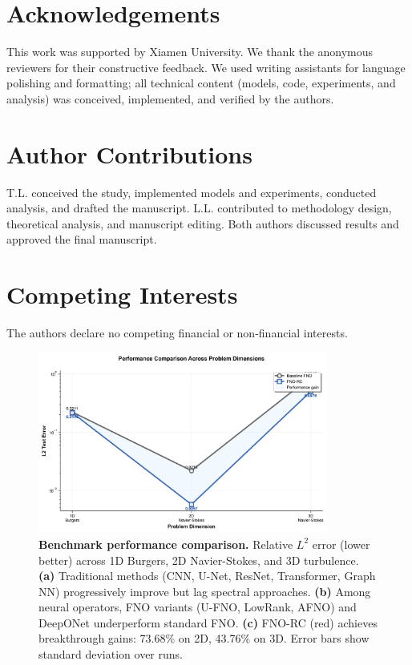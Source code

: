\documentclass[11pt]{article}
\begin{document}
\section*{Acknowledgements}
This work was supported by Xiamen University. We thank the anonymous reviewers for their constructive feedback. We used writing assistants for language polishing and formatting; all technical content (models, code, experiments, and analysis) was conceived, implemented, and verified by the authors.

\section*{Author Contributions}
T.L. conceived the study, implemented models and experiments, conducted analysis, and drafted the manuscript. L.L. contributed to methodology design, theoretical analysis, and manuscript editing. Both authors discussed results and approved the final manuscript.

\section*{Competing Interests}
The authors declare no competing financial or non-financial interests.




\clearpage

\begin{figure}[t]
\centering
\includegraphics[width=0.85\textwidth]{figures/performance_comparison.png}
\caption{\textbf{Benchmark performance comparison.} Relative $L^2$ error (lower better) across 1D Burgers, 2D Navier-Stokes, and 3D turbulence. \textbf{(a)} Traditional methods (CNN, U-Net, ResNet, Transformer, Graph NN) progressively improve but lag spectral approaches. \textbf{(b)} Among neural operators, FNO variants (U-FNO, LowRank, AFNO) and DeepONet underperform standard FNO. \textbf{(c)} FNO-RC (red) achieves breakthrough gains: 73.68\% on 2D, 43.76\% on 3D. Error bars show standard deviation over runs.}
\label{fig:performance}
\end{figure}
\end{document}
